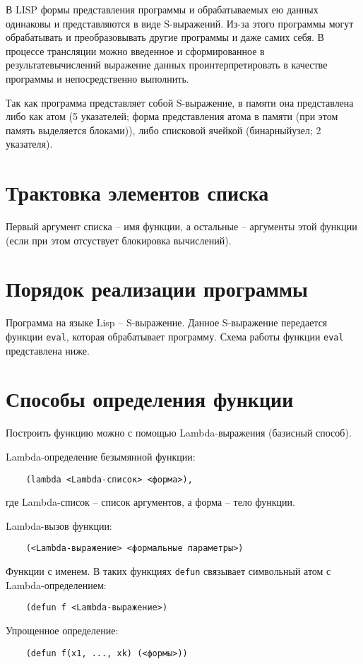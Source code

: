 В LISP формы представления программы и обрабатываемых ею данных одинаковы и представляются в виде S-выражений. Из-за этого программы могут обрабатывать и преобразовывать другие программы и даже самих себя. В процессе трансляции можно введенное и сформированное в результатевычислений выражение данных проинтерпретировать в качестве программы и непосредственно выполнить. 

Так как программа представляет собой S-выражение, в памяти она представлена либо как атом (5 указателей; форма представления атома в памяти (при этом память выделяется блоками)), либо списковой ячейкой (бинарныйузел; 2 указателя).


\section{Трактовка элементов списка}

Первый аргумент списка -- имя функции, а остальные -- аргументы этой функции (если при этом отсуствует блокировка вычислений).


\section{Порядок реализации программы}

Программа на языке Lisp -- S-выражение. Данное S-выражение передается функции \texttt{eval}, которая обрабатывает программу. Схема работы функции \texttt{eval} представлена ниже.



\section{Способы определения функции}

Построить функцию можно с помощью Lambda-выражения (базисный способ).

Lambda-определение безымянной функции:

\begin{lstlisting}
    (lambda <Lambda-список> <форма>),
\end{lstlisting}

где Lambda-список -- список аргументов, а форма -- тело функции.

Lambda-вызов функции:

\begin{lstlisting}
    (<Lambda-выражение> <формальные параметры>)
\end{lstlisting}

Функции с именем. В таких функциях \texttt{defun} связывает символьный атом с Lambda-определением:

\begin{lstlisting}
    (defun f <Lambda-выражение>)
\end{lstlisting}

Упрощенное определение:

\begin{lstlisting}
    (defun f(x1, ..., xk) (<формы>))
\end{lstlisting}
